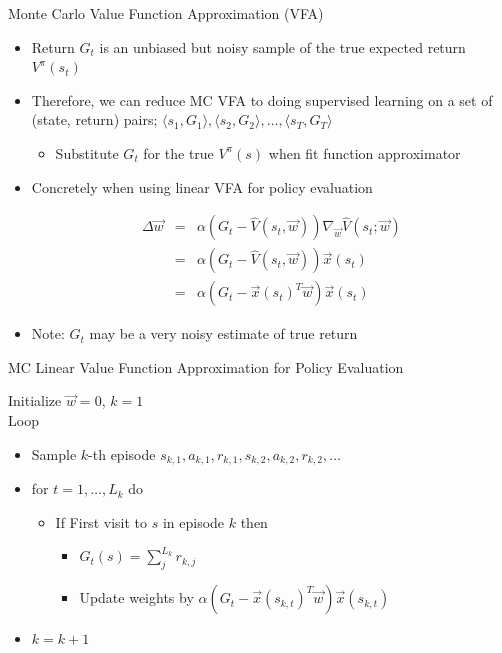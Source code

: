 \begin{frame}[c]{Monte Carlo Value Function Approximation (VFA)}
	
	
	\begin{itemize}
		\item Return $G_t$ is an unbiased but noisy sample of the true expected return $V^\pi(s_t)$
		\item Therefore, we can reduce MC VFA to doing supervised learning on a set of (state, return) pairs; $\langle s_1, G_1 \rangle, \langle s_2, G_2 \rangle,\ldots, \langle s_T, G_T \rangle$
		\begin{itemize}
			\item Substitute $G_t$ for the true $V^\pi(s)$ when fit function approximator
		\end{itemize}
		\item Concretely when using linear VFA for policy evaluation
		
		\begin{eqnarray}
		 \Delta \vec{w} &=& \alpha (G_t - \hat{V} (s_t, \vec{w})) \nabla_\vec{w}\hat{V}(s_t; \vec{w}) \nonumber\\
		 &=& \alpha (G_t - \hat{V} (s_t, \vec{w})) \vec{x}(s_t) \nonumber\\
		 &=& \alpha (G_t - \vec{x}(s_t)^T \vec{w}) \vec{x}(s_t) \nonumber
		\end{eqnarray}
		
		\item Note: $G_t$ may be a very noisy estimate of true return
		
	\end{itemize}
	
\end{frame}
\begin{frame}[c]{MC Linear Value Function Approximation for Policy
		Evaluation}
	

Initialize $\vec{w}= 0$, $k=1$\\
Loop	
	\begin{itemize}
		\item Sample $k$-th episode $s_{k,1}, a_{k,1}, r_{k,1}, s_{k,2}, a_{k,2}, r_{k,2}, \ldots$
		\item for $t=1, \ldots, L_k$ do
		\begin{itemize}
			\item If First visit to $s$ in episode $k$ then
			\begin{itemize}
					\item $G_t(s) = \sum_{j}^{L_k} r_{k,j}$
					\item Update weights by $\alpha (G_t - \vec{x}(s_{k,t})^T \vec{w}) \vec{x}(s_{k,t})$
			\end{itemize}
		\end{itemize}
	\item $k = k + 1$
	\end{itemize}
	
\end{frame}
